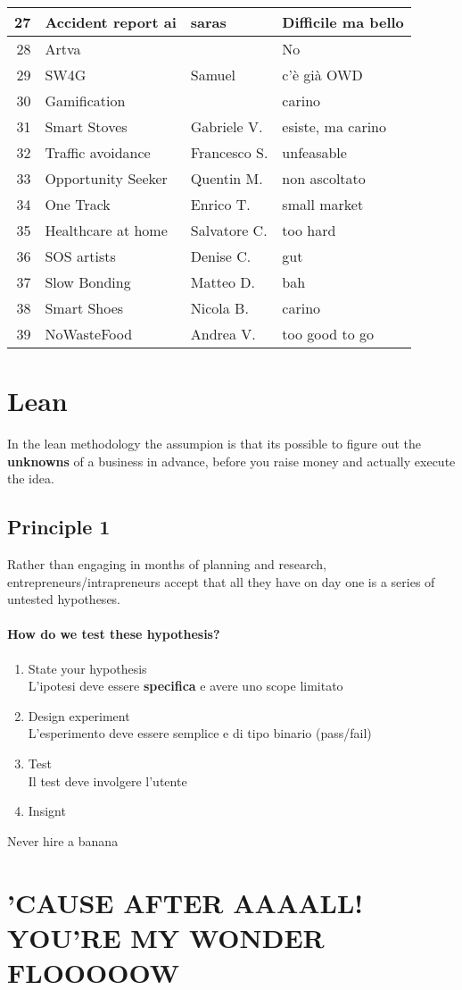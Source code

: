 \documentclass{article}
\begin{document}
\begin{tabular}{r|l l l|}
    27& Accident report ai & saras & Difficile ma bello \\ \hline
    28& Artva & & No \\ \hline
    29& SW4G & Samuel & c'è già OWD \\ \hline
    30& Gamification & & carino \\ \hline
    31& Smart Stoves & Gabriele V. & esiste, ma carino \\ \hline
    32& Traffic avoidance & Francesco S. & unfeasable \\ \hline
    33& Opportunity Seeker & Quentin M. & non ascoltato \\ \hline
    34& One Track & Enrico T. & small market \\ \hline
    35& Healthcare at home & Salvatore C. & too hard \\ \hline
    36& SOS artists & Denise C. & gut \\ \hline
    37& Slow Bonding & Matteo D. & bah \\ \hline
    38& Smart Shoes & Nicola B. & carino \\ \hline
    39& NoWasteFood & Andrea V. & too good to go \\ \hline
\end{tabular}

\section{Lean}
In the lean methodology the assumpion is that its possible to figure out the \textbf{unknowns} of a business in advance, before you raise money and actually execute the idea.

\subsection{Principle 1}
Rather than engaging in months of planning and research, entrepreneurs/intrapreneurs accept that all they have on day one is a series of untested hypotheses.

\paragraph{How do we test these hypothesis?}
\begin{enumerate}
    \item State your hypothesis \\
        L'ipotesi deve essere \textbf{specifica} e avere uno scope limitato
    \item Design experiment \\
        L'esperimento deve essere semplice e di tipo binario (pass/fail)
    \item Test \\
        Il test deve involgere l'utente
    \item Insignt
\end{enumerate}

\begin{warning}{Never hire a banana}
\end{warning}


\section{'CAUSE AFTER AAAALL! YOU'RE MY WONDER FLOOOOOW}
\end{document}
